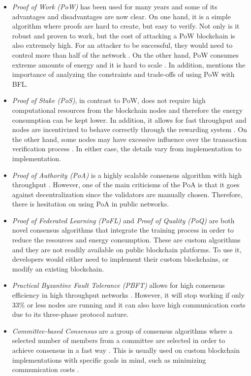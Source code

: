 \begin{itemize}
    \item \textit{Proof of Work (PoW)} has been used for many years and some of its advantages and disadvantages are now clear. On one hand, it is a simple algorithm where proofs are hard to create, but easy to verify. Not only is it robust and proven to work, but the cost of attacking a PoW blockchain is also extremely high. For an attacker to be successful, they would need to control more than half of the network \cite{li_blockchain_2021}. On the other hand, PoW consumes extreme amounts of energy and it is hard to scale \cite{edwood_2020, li_blockchain_2021, ccaf}. In addition, \cite{10.48550/arxiv.2112.07938} mentions the importance of analyzing the constraints and trade-offs of using PoW with BFL.

    \item \textit{Proof of Stake (PoS)}, in contrast to PoW, does not require high computational resources from the blockchain nodes and therefore the energy consumption can be kept lower. In addition, it allows for fast throughput and nodes are incentivized to behave correctly through the rewarding system \cite{li_blockchain_2021}. On the other hand, some nodes may have excessive influence over the transaction verification process \cite{li_blockchain_2021}. In either case, the details vary from implementation to implementation.
    
    \item \textit{Proof of Authority (PoA)} is a highly scalable consensus algorithm with high throughput \cite{binance_academy_2020}. However, one of the main criticisms of the PoA is that it goes against decentralization since the validators are manually chosen. Therefore, there is hesitation on using PoA in public networks.

    \item \textit{Proof of Federated Learning (PoFL)} \cite{9347812, 10.48550/arxiv.2007.15145} and \textit{Proof of Quality (PoQ)} \cite{8843900} are both novel consensus algorithms that integrate the training process in order to reduce the resources and energy consumption. These are custom algorithms and they are not readily available on public blockchain platforms. To use it, developers would either need to implement their custom blockchains, or modify an existing blockchain.

    \item \textit{Practical Byzantine Fault Tolerance (PBFT)} allows for high consensus efficiency in high throughput networks \cite{li_blockchain_2021}. However, it will stop working if only 33\% or less nodes are running and it can also have high communication costs due to its three-phase protocol nature.

    \item \textit{Committee-based Consensus} are a group of consensus algorithms where a selected number of members from a committee are selected in order to achieve consensus in a fast way \cite{qu_blockchain-enabled_2022}. This is usually used on custom blockchain implementations with specific goals in mind, such as minimizing communication costs \cite{9293091}.
\end{itemize}

